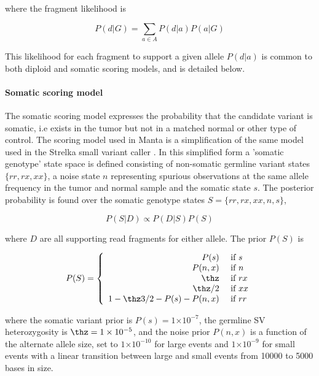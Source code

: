 \documentclass{article}
\newcommand{\e}[1]{\ensuremath{\times 10^{#1}}}
\begin{document}
\noindent
where the fragment likelihood is

\begin{equation*}
P(d \vert G) = \sum_{a \in A} P(d \vert a) P(a|G)
\end{equation*}

This likelihood for each fragment to support a given allele $P(d \vert a)$ is common to both diploid and somatic scoring models, and is detailed below.


\paragraph{Somatic scoring model}

The somatic scoring model expresses the probability that the candidate variant is somatic, i.e exists in the tumor but not in a matched normal or other type of control. The scoring model used in Manta is a simplification of the same model used in the Strelka small variant caller \cite{strelka2012}. In this simplified form a 'somatic genotype' state space is defined consisting of non-somatic germline variant states $\{rr, rx, xx\}$, a noise state $n$ representing spurious observations at the same allele frequency in the tumor and normal sample and the somatic state $s$. The posterior probability is found over the somatic genotype states $S = \{rr,rx,xx,n,s\}$,

\begin{equation*}
P( S \vert D ) \propto P( D \vert S )  P (S)
\end{equation*}

\noindent
where $D$ are all supporting read fragments for either allele. The prior $P(S)$ is

\begin{equation*}
P ( S ) =
\left\{
\begin{array}{rl}
P ( s )  & \mbox{ if $s$} \\
P ( n , x )  & \mbox{ if $n$} \\
\thz      & \mbox{ if $rx$} \\
\thz / 2  & \mbox{ if $xx$} \\
1 - \thz 3 / 2 - P(s) - P(n,x)  & \mbox{ if $rr$}
\end{array}
\right.
\end{equation*}

\noindent
where the somatic variant prior is $P(s) = 1\e{-7}$, the germline SV heterozygosity is $\thz = 1\e{-5}$, and the noise prior $P(n,x)$ is a function of the alternate allele size, set to $1\e{-10}$ for large events and $1\e{-9}$ for small events with a linear transition between large and small events from 10000 to 5000 bases in size.
\end{document}
